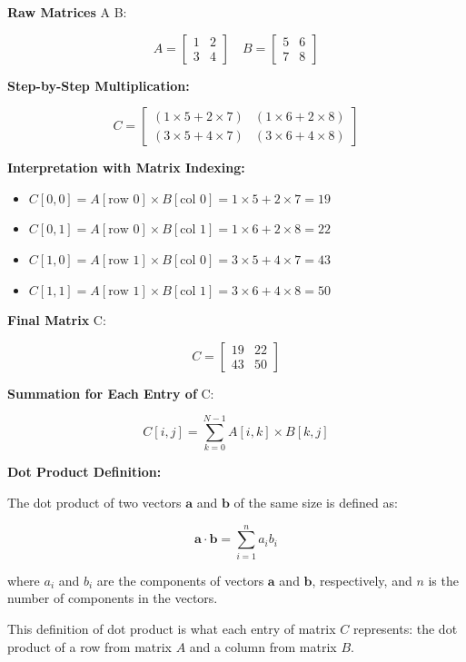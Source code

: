 \documentclass{article}
\begin{document}
\textbf{Raw Matrices} A  B:

\[
A = 
\begin{bmatrix}
1 & 2 \\
3 & 4
\end{bmatrix}
\quad
B = 
\begin{bmatrix}
5 & 6 \\
7 & 8
\end{bmatrix}
\]

\textbf{Step-by-Step Multiplication:}

\[
C = 
\begin{bmatrix}
(1 \times 5 + 2 \times 7) & (1 \times 6 + 2 \times 8) \\
(3 \times 5 + 4 \times 7) & (3 \times 6 + 4 \times 8)
\end{bmatrix}
\]

\textbf{Interpretation with Matrix Indexing:}

\begin{itemize}
    \item \( C[0,0] = A[\text{row 0}] \times B[\text{col 0}] = 1 \times 5 + 2 \times 7 = 19 \)
    \item \( C[0,1] = A[\text{row 0}] \times B[\text{col 1}] = 1 \times 6 + 2 \times 8 = 22 \)
    \item \( C[1,0] = A[\text{row 1}] \times B[\text{col 0}] = 3 \times 5 + 4 \times 7 = 43 \)
    \item \( C[1,1] = A[\text{row 1}] \times B[\text{col 1}] = 3 \times 6 + 4 \times 8 = 50 \)
\end{itemize}

\textbf{Final Matrix} C:

\[
C = 
\begin{bmatrix}
19 & 22 \\
43 & 50
\end{bmatrix}
\]

\textbf{Summation for Each Entry of } C:

\[
C[i,j] = \sum_{k=0}^{N-1} A[i,k] \times B[k,j]
\]

\textbf{Dot Product Definition:}

The dot product of two vectors \( \mathbf{a} \) and \( \mathbf{b} \) of the same size is defined as:

\[
\mathbf{a} \cdot \mathbf{b} = \sum_{i=1}^{n} a_i b_i
\]

where \( a_i \) and \( b_i \) are the components of vectors \( \mathbf{a} \) and \( \mathbf{b} \), respectively, and \( n \) is the number of components in the vectors.

This definition of dot product is what each entry of matrix \( C \) represents: the dot product of a row from matrix \( A \) and a column from matrix \( B \).
\end{document}
